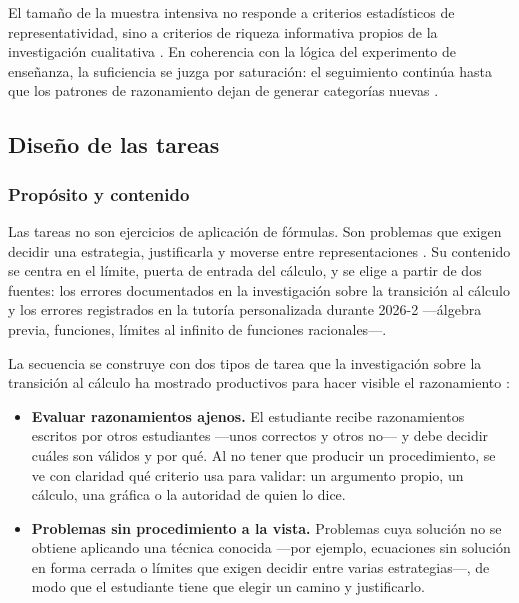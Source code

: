 El tamaño de la muestra intensiva no responde a criterios estadísticos de representatividad, sino a criterios de riqueza informativa propios de la investigación cualitativa \parencite{creswell2014research}. En coherencia con la lógica del experimento de enseñanza, la suficiencia se juzga por saturación: el seguimiento continúa hasta que los patrones de razonamiento dejan de generar categorías nuevas \parencite{cobb2003design}.

\subsection{Diseño de las tareas}

\subsubsection{Propósito y contenido}

Las tareas no son ejercicios de aplicación de fórmulas. Son problemas que exigen decidir una estrategia, justificarla y moverse entre representaciones \parencite{leungDesigningMathematicsTasks2015, radmehrTheoreticalFrameworkTask2023}. Su contenido se centra en el límite, puerta de entrada del cálculo, y se elige a partir de dos fuentes: los errores documentados en la investigación sobre la transición al cálculo \parencite{vandebrouck2021task} y los errores registrados en la tutoría personalizada durante 2026-2 ---álgebra previa, funciones, límites al infinito de funciones racionales---.

La secuencia se construye con dos tipos de tarea que la investigación sobre la transición al cálculo ha mostrado productivos para hacer visible el razonamiento \parencite{vandebrouck2021task}:

\begin{itemize}
\item \textbf{Evaluar razonamientos ajenos.} El estudiante recibe razonamientos escritos por otros estudiantes ---unos correctos y otros no--- y debe decidir cuáles son válidos y por qué. Al no tener que producir un procedimiento, se ve con claridad qué criterio usa para validar: un argumento propio, un cálculo, una gráfica o la autoridad de quien lo dice.

\item \textbf{Problemas sin procedimiento a la vista.} Problemas cuya solución no se obtiene aplicando una técnica conocida ---por ejemplo, ecuaciones sin solución en forma cerrada o límites que exigen decidir entre varias estrategias---, de modo que el estudiante tiene que elegir un camino y justificarlo.
\end{itemize}

